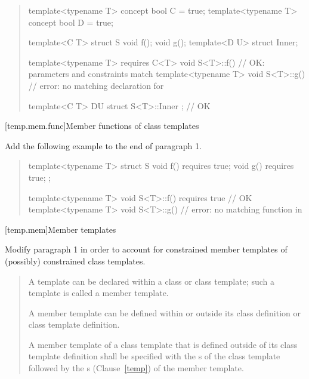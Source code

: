\begin{quote}
\begin{addedblock}
\enterexample
\begin{codeblock}
template<typename T> concept bool C = true;
template<typename T> concept bool D = true;

template<C T> struct S {
    void f();
    void g();
    template<D U> struct Inner;
  }

template<typename T> requires C<T> void S<T>::f() { } // OK: parameters and constraints match
template<typename T> void S<T>::g() { } // error: no matching declaration for 

template<C T> D{U} struct S<T>::Inner { }; // OK
\end{codeblock}
\exitexample
\end{addedblock}
\end{quote}

[temp.mem.func]{Member functions of class templates}

Add the following example to the end of paragraph 1.

\begin{quote}
\begin{addedblock}
\enterexample
\begin{codeblock}
template<typename T> struct S {
  void f() requires true;
  void g() requires true;
};

template<typename T> 
  void S<T>::f() requires true { } // OK
template<typename T> 
  void S<T>::g() { }               // error: no matching function in 
\end{codeblock}
\exitexample
\end{addedblock}
\end{quote}


[temp.mem]{Member templates}


Modify paragraph 1 in order to account for constrained member templates
of (possibly) constrained class templates. 

\begin{quote}
A template can be declared within a class or class template; such a 
template is called a member template. 

A member template can be defined within or outside its class definition 
or class template definition. 

A member template of a class template that is defined outside of its 
class template definition shall be specified with the 
s 
of the class template followed by the s
 (Clause~\ref{temp}) of the member template.
\end{quote}


